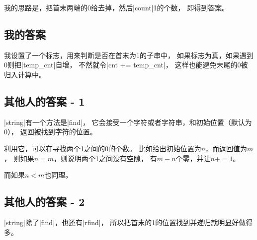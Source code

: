 我的思路是，把首末两端的0给去掉，然后\vb|count|1的个数，
即得到答案。

\subsection{我的答案}
我设置了一个标志，用来判断是否在首末为1的子串中，
如果标志为真，如果遇到0则把\vb|temp_cnt|自增，
不然就令\vb|cnt += temp_cnt|，
这样也能避免末尾的0被归入计算中。

\subsection{其他人的答案 - 1}
\vb|string|有一个方法是\vb|find|，
它会接受一个字符或者字符串，和初始位置（默认为0），
返回被找到字符的位置。

利用它，可以在寻找两个1之间的0的个数。
比如给出初始位置为$n$，而返回值为$m$，
则如果$n = m$，则说明两个1之间没有空隙，
有$m - n$个零，并让$n += 1$。

而如果$n < m$也同理。

\subsection{其他人的答案 - 2}
\vb|string|除了\vb|find|，也还有\vb|rfind|，
所以把首末的1的位置找到并递归就明显好做得多。

